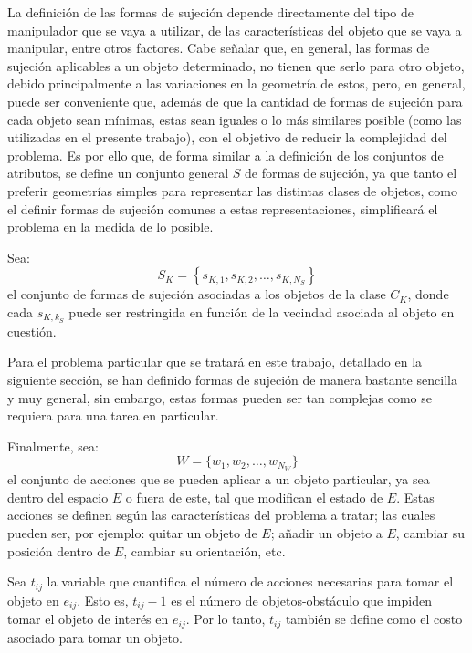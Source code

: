 La definición de las formas de sujeción depende directamente del tipo de manipulador que se vaya a utilizar, de las características del objeto que se vaya a manipular, entre otros factores.
Cabe señalar que, en general, las formas de sujeción aplicables a un objeto determinado, no tienen que serlo para otro objeto, debido principalmente a las variaciones en la geometría de estos, pero, en general, puede ser conveniente que, además de que la cantidad de formas de sujeción para cada objeto sean mínimas, estas sean iguales o lo más similares posible (como las utilizadas en el presente trabajo), con el objetivo de reducir la complejidad del problema.
Es por ello que, de forma similar a la definición de los conjuntos de atributos, se define un conjunto general $S$ de formas de sujeción, ya que tanto el preferir geometrías simples para representar las distintas clases de objetos, como el definir formas de sujeción comunes a estas representaciones, simplificará el problema en la medida de lo posible.

Sea:
%
\begin{equation}
\label{eq:sujecion_objeto}
S_K = \left\{s_{K, 1}, s_{K, 2}, \ldots, s_{K, N_S}\right\}
\end{equation}
%
el conjunto de formas de sujeción asociadas a los objetos de la clase $C_K$, donde cada $s_{K, k_S}$ puede ser restringida en función de la vecindad asociada al objeto en cuestión.

Para el problema particular que se tratará en este trabajo, detallado en la siguiente sección, se han definido formas de sujeción de manera bastante sencilla y muy general, sin embargo, estas formas pueden ser tan complejas como se requiera para una tarea en particular.

Finalmente, sea:
%
\begin{equation}
\label{eq:acciones}
W = \{w_1, w_2, \ldots, w_{N_W}\}
\end{equation}
%
el conjunto de acciones que se pueden aplicar a un objeto particular, ya sea dentro del espacio $E$ o fuera de este, tal que modifican el estado de $E$.
Estas acciones se definen según las características del problema a tratar; las cuales pueden ser, por ejemplo: quitar un objeto de $E$; añadir un objeto a $E$, cambiar su posición dentro de $E$, cambiar su orientación, etc.

Sea $t_{ij}$ la variable que cuantifica el número de acciones necesarias para tomar el objeto en $e_{ij}$.
Esto es, $t_{ij}-1$ es el número de objetos-obstáculo que impiden tomar el objeto de interés en $e_{ij}$.
Por lo tanto, $t_{ij}$ también se define como el costo asociado para tomar un objeto.

